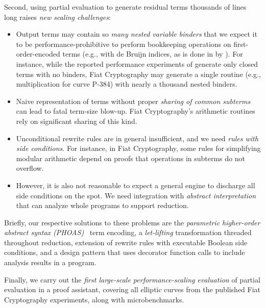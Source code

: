 Second, using partial evaluation to generate residual terms thousands of lines long raises \emph{new scaling challenges}:
\begin{itemize}
\item Output terms may contain so \emph{many nested variable binders} that we expect it to be performance-prohibitive to perform bookkeeping operations on first-order-encoded terms (e.g., with de Bruijn indices, as is done in \Rtac{} by \textcite{rtac}).  For instance, while the reported performance experiments of \textcite{Aehlig} generate only closed terms with no binders, Fiat Cryptography may generate a single routine (e.g., multiplication for curve P-384) with nearly a thousand nested binders.
\item Naive representation of terms without proper \emph{sharing of common subterms} can lead to fatal term-size blow-up.  Fiat Cryptography's arithmetic routines rely on significant sharing of this kind.
\item Unconditional rewrite rules are in general insufficient, and we need \emph{rules with side conditions}.  For instance, in Fiat Cryptography, some rules for simplifying modular arithmetic depend on proofs that operations in subterms do not overflow.
\item However, it is also not reasonable to expect a general engine to discharge all side conditions on the spot.  We need integration with \emph{abstract interpretation} that can analyze whole programs to support reduction.
\end{itemize}

Briefly, our respective solutions to these problems are the \emph{parametric higher-order abstract syntax (PHOAS)}~\cite{PhoasICFP08} term encoding, a \emph{let-lifting} transformation threaded throughout reduction, extension of rewrite rules with executable Boolean side conditions, and a design pattern that uses decorator function calls to include analysis results in a program.

Finally, we carry out the \emph{first large-scale performance-scaling evaluation} of partial evaluation in a proof assistant, covering all elliptic curves from the published Fiat Cryptography experiments, along with microbenchmarks.

